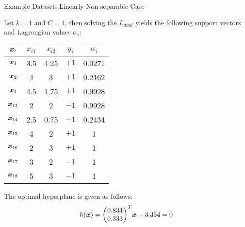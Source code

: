 \begin{frame}{Example Dataset: Linearly Non-separable Case}

    Let $k=1$ and $C=1$, then solving the $L_{dual}$ yields the
    following support vectors and Lagrangian values
    $\alpha_i$:
    \begin{center}%
    {\renewcommand{\arraystretch}{1.1}\begin{tabular}{|c|c|c|c|c|}
        \hline
        ${\boldsymbol x}_i$ & $x_{i1}$ & $x_{i2}$ & $y_i$ & $\alpha_i$\\
        \hline
        ${\boldsymbol x}_1$ & 3.5 & 4.25 & $+1$ & 0.0271\\
        ${\boldsymbol x}_2$ & 4 & 3 & $+1$ & 0.2162\\
        ${\boldsymbol x}_4$ & 4.5 & 1.75 & $+1$ & 0.9928\\
        ${\boldsymbol x}_{13}$ & 2 & 2 & $-1$ & 0.9928\\
        ${\boldsymbol x}_{14}$ & 2.5 & 0.75 & $-1$ & 0.2434\\
        ${\boldsymbol x}_{15}$ & 4 & 2 & $+1$ & 1\\
        ${\boldsymbol x}_{16}$ & 2 & 3 & $+1$ & 1\\
        ${\boldsymbol x}_{17}$ & 3 & 2 & $-1$ & 1\\
        ${\boldsymbol x}_{18}$ & 5 & 3 & $-1$ & 1\\
        \hline
   \end{tabular}}\vspace*{6pt}
    \end{center}
The optimal hyperplane is given as follows:
\begin{align*}
    h(\bx) = \cramped{\matr{0.834\\0.333}^T} \bx - 3.334 = 0
\end{align*}
\end{frame}

